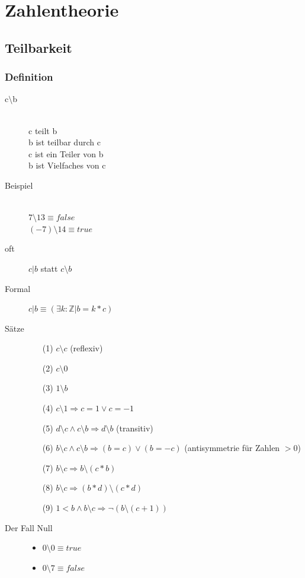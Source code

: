 \documentclass[a4paper,10pt]{article}
\newcommand{\ZN}{\mathbb{Z}} %
\newcommand{\Teilt}{\setminus} %
\newcommand{\Ra}{\Rightarrow}
\begin{document}
\newpage
\section{Zahlentheorie}

\subsection{Teilbarkeit}
\subsubsection{Definition}
\begin{description}
	\item[c$ \Teilt $b] \hfill \\
		c teilt b \\
		b ist teilbar durch c \\
		c ist ein Teiler von b \\
		b ist Vielfaches von c
	\item[Beispiel] \hfill \\
		$7  \Teilt  13 \equiv false$ \\
		$(-7)  \Teilt  14 \equiv true$
	\item[oft] $c|b$ statt $c  \Teilt  b$
	\item[Formal] $c|b \equiv (\exists k:\ZN|b=k*c)$
	\item[S\"atze] \hfill
		\begin{itemize}
			\item[(1)] $c \Teilt c$ (reflexiv)
			\item[(2)] $c \Teilt 0$
			\item[(3)] $1 \Teilt b$
			\item[(4)] $c \Teilt 1 \Ra c=1 \vee c=-1$
			\item[(5)] $d \Teilt c \wedge c \Teilt b \Ra d \Teilt b$ (transitiv)
			\item[(6)] $b \Teilt c \wedge c \Teilt b \Ra (b = c) \vee ( b=-c)$ (antisymmetrie f\"ur Zahlen $>0$)
			\item[(7)] $b \Teilt c \Ra b \Teilt (c*b)$
			\item[(8)] $b \Teilt c \Ra (b*d) \Teilt (c*d)$
			\item[(9)] $1 < b \wedge b \Teilt c \Ra \neg (b \Teilt (c+1))$
		\end{itemize}
	\item[Der Fall Null] \hfill
		\begin{itemize}
			\item $0 \Teilt 0 \equiv true$
			\item $0 \Teilt 7 \equiv false$
		\end{itemize}
\end{description}
\end{document}
